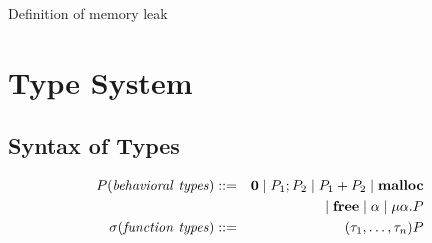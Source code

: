 \documentclass[english]{jssst_ppl} %
\newcommand\tB{\;|\;}
\newcommand\LET{\mathbf{let}\;}
\newcommand\FREE{\mathbf{free(x)}\;}
\newcommand\IN{\mathbf{in}\;}
\newcommand\Rtab{\; \; \; \;}
\newcommand\Lfc{\left\{}
\newcommand\Rfc{\right\}}
\newcommand\Lb{\left[}
\newcommand\Rb{\right]}
\newcommand\coma{,\;}
\newcommand\Malloc{\mathbf{malloc}}
\newcommand\Free{\mathbf{free}}
\theoremstyle{definition}
\begin{document}
%

Definition of memory leak

\section{Type System}

\subsection{Syntax of Types}
     \begin{eqnarray*}
       P (\mathit{behavioral\ types})::=&& {\bf 0} \tB P_{1};P_{2} \tB P_{1}+P_{2} \tB \Malloc\\
       &&\tB \Free \tB \alpha \tB \mu\alpha.P \\
       \sigma (\mathit{function\ types})::=&& (\tau_{1},\dots, \tau_{n}) P
     \end{eqnarray*}
\end{document}
